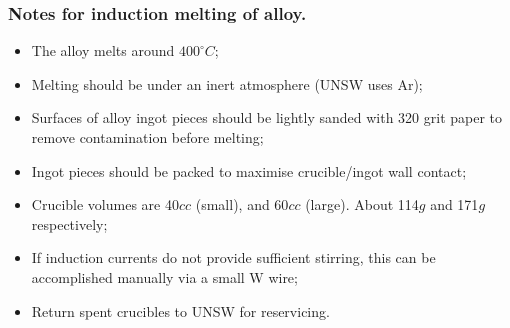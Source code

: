 \subsubsection{Notes for induction melting of \MgZnCa alloy.}
\begin{itemize}
\item The \MgZnCa alloy melts around $400^{\circ}C$;
\item Melting should be under an inert atmosphere (UNSW uses Ar);
\item Surfaces of alloy ingot pieces should be lightly sanded with 320 grit paper to remove contamination before melting;
\item Ingot pieces should be packed to maximise crucible/ingot wall contact;
\item Crucible volumes are 40$cc$ (small), and 60$cc$ (large). About 114$g$ and 171$g$ respectively;
\item If induction currents do not provide sufficient stirring, this can be accomplished manually via a small W wire; 
\item Return spent crucibles to UNSW for reservicing. 
\end{itemize}